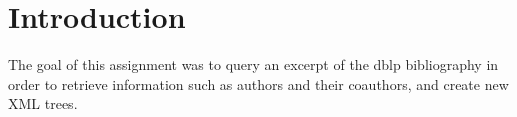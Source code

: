 \section{Introduction}

The goal of this assignment was to query an excerpt of the dblp bibliography
in order to retrieve information such as authors and their coauthors, and
create new XML trees.
